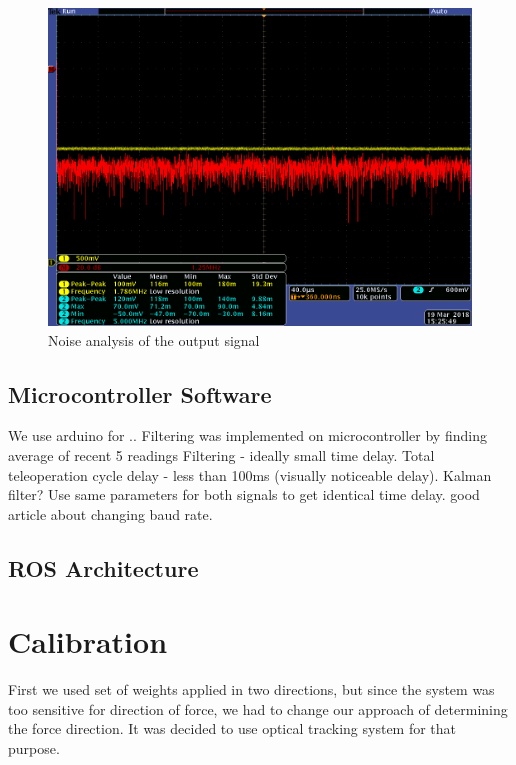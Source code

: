 		\begin{figure}[h]
			\begin{center}
			\includegraphics[width=120mm]{fig/results/40us_1stADC.png}
			\end{center}
			\vspace{-4mm}
		\caption[Noise analysis of the output signal]
		{Noise analysis of the output signal}
		\label{fig:OutputSignal}
		\vspace{-2mm}
		\end{figure}

	\subsection{Microcontroller Software}
	\label{sec:MicrSoft}
	We use arduino for ..
	Filtering was implemented on microcontroller by finding average of recent 5 readings 
	Filtering - ideally small time delay. Total teleoperation cycle delay - less than 100ms (visually noticeable delay). Kalman filter? Use same parameters for both signals to get identical time delay.
	good article about changing baud rate.

	\subsection{ROS Architecture}
	\label{sec:p2}
	
\section{Calibration}
\label{section:Calibration}
First we used set of weights applied in two directions, but since the system was too sensitive for direction of force, we had to change our approach of determining the force direction. It was decided to use optical tracking system for that purpose.

